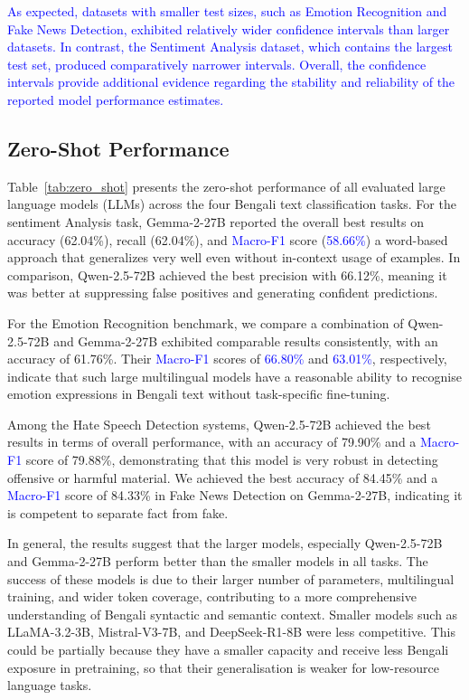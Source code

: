 \documentclass[10pt,letterpaper]{article}
\newcommand{\rev}[1]{\textcolor{blue}{#1}}
\begin{document}
\rev{As expected, datasets with smaller test sizes, such as Emotion Recognition and Fake News Detection, exhibited relatively wider confidence intervals than larger datasets. In contrast, the Sentiment Analysis dataset, which contains the largest test set, produced comparatively narrower intervals. Overall, the confidence intervals provide additional evidence regarding the stability and reliability of the reported model performance estimates.}



\subsection*{Zero-Shot Performance}
\label{sec:zero_shot}

Table~\ref{tab:zero_shot} presents the zero-shot performance of all evaluated large language models (LLMs) across the four Bengali text classification tasks. For the sentiment Analysis task, Gemma-2-27B reported the overall best results on accuracy (62.04\%), recall (62.04\%), and \rev{Macro-F1} score (\rev{58.66\%}) a word-based approach that generalizes very well even without in-context usage of examples. In comparison, Qwen-2.5-72B achieved the best precision with 66.12\%, meaning it was better at suppressing false positives and generating confident predictions.

For the Emotion Recognition benchmark, we compare a combination of Qwen-2.5-72B and Gemma-2-27B exhibited comparable results consistently, with an accuracy of 61.76\%. Their \rev{Macro-F1} scores of \rev{66.80\%} and \rev{63.01\%}, respectively, indicate that such large multilingual models have a reasonable ability to recognise emotion expressions in Bengali text without task-specific fine-tuning.

Among the Hate Speech Detection systems, Qwen-2.5-72B achieved the best results in terms of overall performance, with an accuracy of 79.90\% and a \rev{Macro-F1} score of 79.88\%, demonstrating that this model is very robust in detecting offensive or harmful material. We achieved the best accuracy of 84.45\% and a \rev{Macro-F1} score of 84.33\% in Fake News Detection on Gemma-2-27B, indicating it is competent to separate fact from fake.

In general, the results suggest that the larger models, especially Qwen-2.5-72B and Gemma-2-27B perform better than the smaller models in all tasks. The success of these models is due to their larger number of parameters, multilingual training, and wider token coverage, contributing to a more comprehensive understanding of Bengali syntactic and semantic context. Smaller models such as LLaMA-3.2-3B, Mistral-V3-7B, and DeepSeek-R1-8B were less competitive. This could be partially because they have a smaller capacity and receive less Bengali exposure in pretraining, so that their generalisation is weaker for low-resource language tasks.
\end{document}
